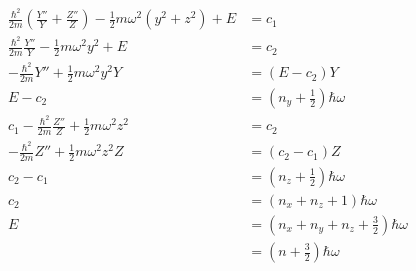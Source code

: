 \documentclass{article}
\begin{document}
\begin{enumerate}
\begin{align*}
          \frac{\hbar^2}{2 m} \left( \frac{Y''}{Y} + \frac{Z''}{Z} \right) - \frac{1}{2} m \omega^2 (y^2 + z^2) + E                    & = c_1                                                       \\
          \frac{\hbar^2}{2 m} \frac{Y''}{Y} - \frac{1}{2} m \omega^2 y^2 + E                                                           & = c_2                                                       \\
          -\frac{\hbar^2}{2 m} Y'' + \frac{1}{2} m \omega^2 y^2 Y                                                                      & = (E - c_2) Y                                               \\
          E - c_2                                                                                                                      & = \left( n_y + \frac{1}{2} \right) \hbar \omega             \\
          c_1 - \frac{\hbar^2}{2 m} \frac{Z''}{Z} + \frac{1}{2} m \omega^2 z^2                                                         & = c_2                                                       \\
          -\frac{\hbar^2}{2 m} Z'' + \frac{1}{2} m \omega^2 z^2 Z                                                                      & = (c_2 - c_1) Z                                             \\
          c_2 - c_1                                                                                                                    & = \left( n_z + \frac{1}{2} \right) \hbar \omega             \\
          c_2                                                                                                                          & = (n_x + n_z + 1) \hbar \omega                              \\
          E                                                                                                                            & = \left( n_x + n_y + n_z + \frac{3}{2} \right) \hbar \omega \\
                                                                                                                                       & = \left( n + \frac{3}{2} \right) \hbar \omega
        \end{align*}
\end{enumerate}

\setcounter{subsection}{47}
\subsection{}
\end{document}
